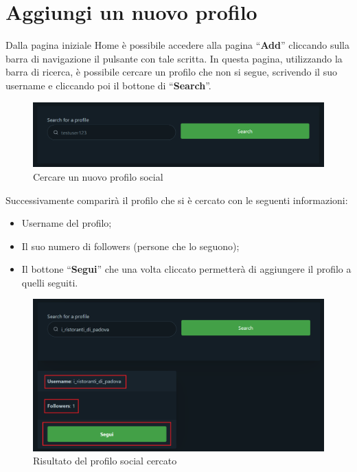 \section{Aggiungi un nuovo profilo} {
    Dalla pagina iniziale Home è possibile accedere alla pagina ``\textbf{Add}'' cliccando sulla barra di navigazione il pulsante con tale scritta.
    \aCapo
    In questa pagina, utilizzando la barra di ricerca, è possibile cercare un profilo che non si segue, scrivendo il suo username e cliccando poi il bottone di ``\textbf{Search}''. 
    
    \begin{figure}[H]
        \includegraphics[width=12cm]{sezioni/images/add.png}
        \centering
        \caption{Cercare un nuovo profilo social}
    \end{figure}
    
    Successivamente comparirà il profilo che si è cercato con le seguenti informazioni:
    \begin{itemize}
        \item Username del profilo;
        \item Il suo numero di followers (persone che lo seguono);
        \item Il bottone ``\textbf{Segui}'' che una volta cliccato permetterà di aggiungere il profilo a quelli seguiti.
    \end{itemize}

    \begin{figure}[H]
        \includegraphics[width=12cm]{sezioni/images/risultato-add.png}
        \centering
        \caption{Risultato del profilo social cercato}
    \end{figure}

}
